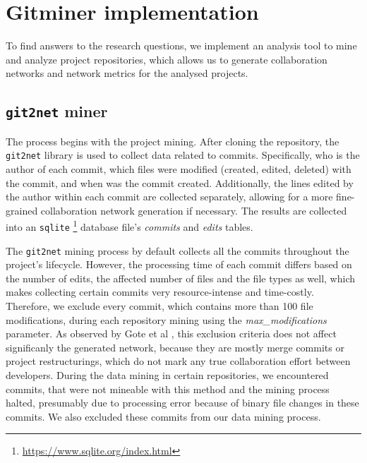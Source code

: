 

\section{Gitminer implementation}
To find answers to the research questions, we implement an analysis tool to mine and analyze project repositories, which allows us to generate collaboration networks and network metrics for the analysed projects.

\subsection{\texttt{git2net} miner}
The process begins with the project mining. After cloning the repository, the \texttt{git2net} \cite{goteAnalysingTimeStampedCoEditing2019} library is used to collect data related to commits. Specifically, who is the author of each commit, which files were modified (created, edited, deleted) with the commit, and when was the commit created. Additionally, the lines edited by the author within each commit are collected separately, allowing for a more fine-grained collaboration network generation if necessary. The results are collected into an \texttt{sqlite} \footnote{\url{https://www.sqlite.org/index.html}} database file's \textit{commits} and \textit{edits} tables.

The \texttt{git2net} mining process by default collects all the commits throughout the project's lifecycle. However, the processing time of each commit differs based on the number of edits, the affected number of files and the file types as well, which makes collecting certain commits very resource-intense and time-costly. Therefore, we exclude every commit, which contains more than 100 file modifications, during each repository mining using the \textit{max\_modifications} parameter. As observed by Gote et al \cite{goteAnalysingTimeStampedCoEditing2019}, this exclusion criteria does not affect significanly the generated network, because they are mostly merge commits or project restructurings, which do not mark any true collaboration effort between developers. During the data mining in certain repositories, we encountered commits, that were not mineable with this method and the mining process halted, presumably due to processing error because of binary file changes in these commits. We also excluded these commits from our data mining process.

